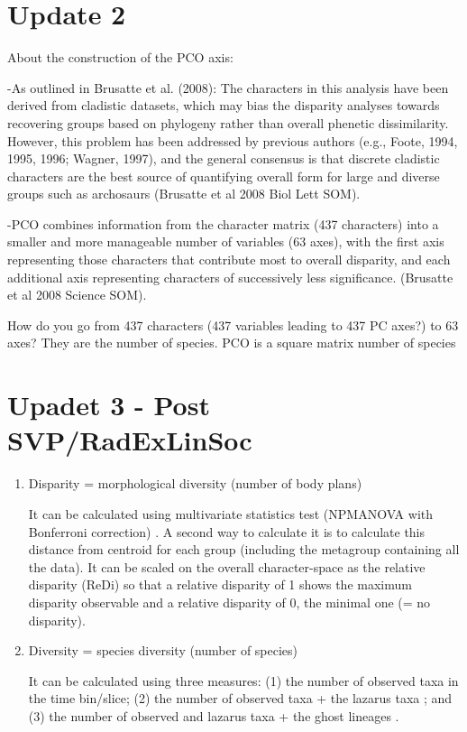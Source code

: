 \documentclass[a4paper,11pt]{article}
\begin{document}
\section{Update 2}
About the construction of the PCO axis:

-As outlined in Brusatte et al. (2008): The characters in this analysis have been derived from cladistic datasets, which may bias the disparity analyses towards recovering groups based on phylogeny rather than overall phenetic dissimilarity. However, this problem has been addressed by previous authors (e.g., Foote, 1994, 1995, 1996; Wagner, 1997), and the general consensus is that discrete cladistic characters are the best source of quantifying overall form for large and diverse groups such as archosaurs (Brusatte et al 2008 Biol Lett SOM).

-PCO combines information from the character matrix (437 characters) into a smaller and more manageable number of variables (63 axes), with the first axis representing those characters that contribute most to overall disparity, and each additional axis representing characters of successively less significance. (Brusatte et al 2008 Science SOM).

How do you go from 437 characters (437 variables leading to 437 PC axes?) to 63 axes? They are the number of species. PCO is a square matrix number of species 

\section{Upadet 3 - Post SVP/RadExLinSoc}
\begin{enumerate}
\item{Disparity = morphological diversity (number of body plans)} \citep{friedmanexplosive2010}

It can be calculated using multivariate statistics test (NPMANOVA with Bonferroni correction) \citep{thorneresetting2011}. A second way to calculate it is to calculate this distance from centroid for each group (including the metagroup containing all the data). It can be scaled on the overall character-space as the relative disparity (ReDi) so that a relative disparity of 1 shows the maximum disparity observable and a relative disparity of 0, the minimal one (= no disparity).
\item{Diversity = species diversity (number of species)}

It can be calculated using three measures: (1) the number of observed taxa in the time bin/slice; (2) the number of observed taxa + the lazarus taxa ; and (3) the number of observed and lazarus taxa + the ghost lineages \citep{thorneresetting2011}.
\end{enumerate}
\end{document}
